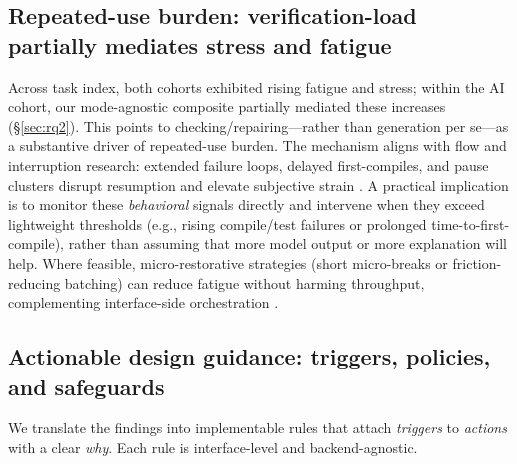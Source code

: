 \documentclass[sigconf]{acmart}
\begin{document}
\subsection{Repeated-use burden: verification-load partially mediates stress and fatigue}
Across task index, both cohorts exhibited rising fatigue and stress; within the AI cohort, our mode-agnostic composite partially mediated these increases (\S\ref{sec:rq2}). This points to checking/repairing---rather than generation per se---as a substantive driver of repeated-use burden. The mechanism aligns with flow and interruption research: extended failure loops, delayed first-compiles, and pause clusters disrupt resumption and elevate subjective strain \cite{mark2008cost}. A practical implication is to monitor these \emph{behavioral} signals directly and intervene when they exceed lightweight thresholds (e.g., rising compile/test failures or prolonged time-to-first-compile), rather than assuming that more model output or more explanation will help. Where feasible, micro-restorative strategies (short micro-breaks or friction-reducing batching) can reduce fatigue without harming throughput, complementing interface-side orchestration \cite{albulescu2022give,helton2015short,kaida2006validation}.

\subsection{Actionable design guidance: triggers, policies, and safeguards}
\label{sec:discussion-design}
We translate the findings into implementable rules that attach \emph{triggers} to \emph{actions} with a clear \emph{why}. Each rule is interface-level and backend-agnostic.
\end{document}
